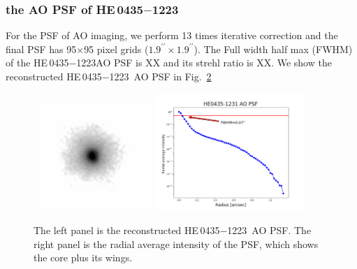 \documentclass[useAMS,usenatbib]{mnras}
\newcommand\he{HE\,0435$-$1223}
\begin{document}
\begin{figure}
\centering
\caption{}
\label{fig:HE0435_Ddt}
\end{figure}

\subsubsection{the AO PSF of \he}
For the PSF of AO imaging, we perform 13 times iterative correction and the final PSF has 95$\times$95 pixel grids ($1.9^{\prime\prime}\times1.9^{\prime\prime}$). The Full width half max (FWHM) of the \he AO PSF is XX and its strehl ratio is XX. We show the reconstructed \he~AO PSF in Fig.~\ref{fig:HE0435_AO_PSF} 
\begin{figure}
  \centering
  \includegraphics[width=0.4\textwidth, clip]{HE0435_AO_PSF3.png}
  \includegraphics[width=0.5\textwidth, clip]{HE0435_PSF_radius.png}
  \caption{The left panel is the reconstructed \he~AO PSF. The right panel is the radial average intensity of the PSF, which shows the core plus its wings.}
\label{fig:HE0435_AO_PSF}
\end{figure}
\end{document}
